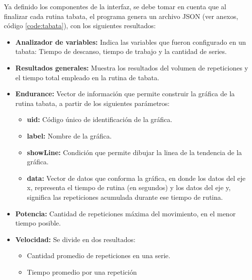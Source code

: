 Ya definido los componentes de la interfaz, se debe tomar en cuenta que al finalizar cada rutina tabata, el programa genera un archivo JSON (ver anexos, c\'odigo  \ref{code:tabata}), con los siguientes resultados:
\begin{itemize}
	\item \textbf{Analizador de variables:} Indica las variables que fueron configurado en un tabata: Tiempo de descanso, tiempo de trabajo y la cantidad de series.
	\item  \textbf{Resultados generales:} Muestra los resultados del volumen de repeticiones  y el tiempo total empleado en la rutina de tabata.
	\item  \textbf{Endurance:} Vector de informaci\'on que permite construir la gr\'afica de la rutina tabata, a partir de los siguientes par\'ametros:
	   \begin{itemize}  
   	\item \textbf{uid:} C\'odigo \'unico de identificaci\'on de la gr\'afica.
   	\item \textbf{label:} Nombre de la gr\'afica.
   	\item \textbf{showLine:} Condici\'on que permite dibujar la linea de la tendencia de la gr\'afica.
    \item \textbf{data:} Vector de datos que conforma la gr\'afica, en donde los datos del eje x, representa el tiempo de rutina (en segundos) y los datos del eje y, significa las repeticiones acumulada durante ese tiempo de rutina.
   \end{itemize}     
    \item \textbf{Potencia:} Cantidad de repeticiones m\'axima del movimiento, en el menor tiempo posible.
    \item \textbf{Velocidad:} Se divide en dos resultados:
           \begin{itemize}
       \item Cantidad promedio de repeticiones en una serie.
       \item Tiempo promedio por una repetici\'on
       \end{itemize}
\end{itemize} 

